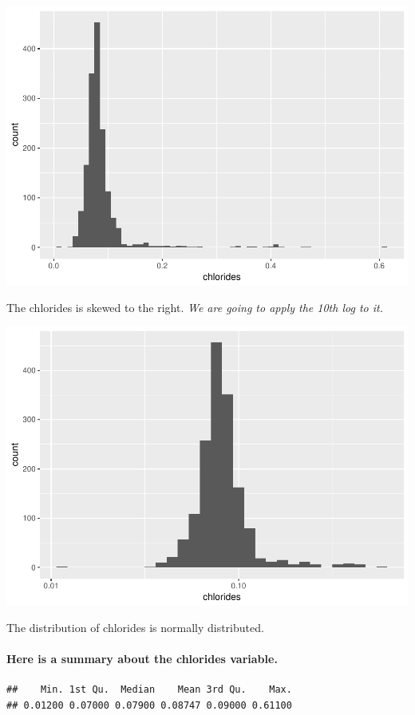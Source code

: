 \documentclass[]{article}
\let\oldparagraph\paragraph
\renewcommand{\paragraph}[1]{\oldparagraph{#1}\mbox{}}
\begin{document}
\includegraphics{RedWine_files/figure-latex/Make_Plot_Function_For_chlorides-1.pdf}

The chlorides is skewed to the right. \emph{We are going to apply the
10th log to it.}

\includegraphics{RedWine_files/figure-latex/Make_Plot_Function_For_chlorides_log10-1.pdf}

The distribution of chlorides is normally distributed.

\paragraph{Here is a summary about the chlorides
variable.}\label{here-is-a-summary-about-the-chlorides-variable.}

\begin{verbatim}
##    Min. 1st Qu.  Median    Mean 3rd Qu.    Max. 
## 0.01200 0.07000 0.07900 0.08747 0.09000 0.61100
\end{verbatim}
\end{document}
